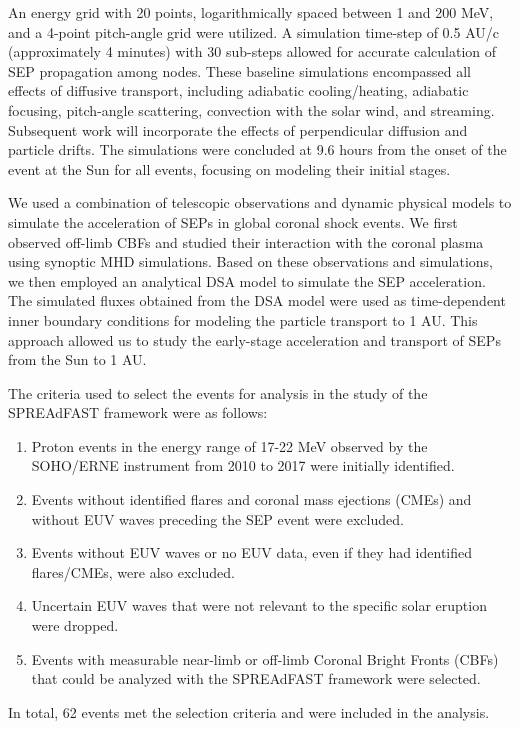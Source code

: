 An energy grid with 20 points, logarithmically spaced between 1 and 200 MeV, and a 4-point pitch-angle grid were utilized. A simulation time-step of 0.5 AU/c (approximately 4 minutes) with 30 sub-steps allowed for accurate calculation of SEP propagation among nodes. These baseline simulations encompassed all effects of diffusive transport, including adiabatic cooling/heating, adiabatic focusing, pitch-angle scattering, convection with the solar wind, and streaming. Subsequent work will incorporate the effects of perpendicular diffusion and particle drifts. The simulations were concluded at 9.6 hours from the onset of the event at the Sun for all events, focusing on modeling their initial stages.

We used a combination of telescopic observations and dynamic physical models to simulate the acceleration of SEPs in global coronal shock events. We first observed off-limb CBFs and studied their interaction with the coronal plasma using synoptic MHD simulations. Based on these observations and simulations, we then employed an analytical DSA model to simulate the SEP acceleration. The simulated fluxes obtained from the DSA model were used as time-dependent inner boundary conditions for modeling the particle transport to 1 AU. This approach allowed us to study the early-stage acceleration and transport of SEPs from the Sun to 1 AU.

The criteria used to select the events for analysis in the study of the SPREAdFAST framework were as follows:
\begin{enumerate}
    \item Proton events in the energy range of 17-22 MeV observed by the SOHO/ERNE instrument from 2010 to 2017 were initially identified.
    \item Events without identified flares and coronal mass ejections (CMEs) and without EUV waves preceding the SEP event were excluded.
    \item Events without EUV waves or no EUV data, even if they had identified flares/CMEs, were also excluded.
    \item Uncertain EUV waves that were not relevant to the specific solar eruption were dropped.
    \item Events with measurable near-limb or off-limb Coronal Bright Fronts (CBFs) that could be analyzed with the SPREAdFAST framework were selected.
\end{enumerate}
In total, 62 events met the selection criteria and were included in the analysis.

